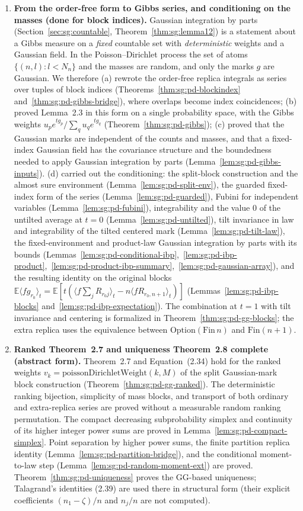 \begin{enumerate}
\item \textbf{From the order-free form to Gibbs series, and conditioning on the masses (done for block indices).} Gaussian integration by parts (Section~\ref{sec:sg:countable}, Theorem~\ref{thm:sg:lemma12}) is a statement about a Gibbs measure on a \emph{fixed} countable set with \emph{deterministic} weights and a Gaussian field. In the Poisson--Dirichlet process the set of atoms $\{(n,l):l<N_n\}$ and the masses are random, and only the marks $g$ are Gaussian. We therefore (a) rewrote the order-free replica integrals as series over tuples of block indices (Theorems~\ref{thm:sg:pd-blockindex} and~\ref{thm:sg:pd-gibbs-bridge}), where overlaps become index coincidences; (b) proved Lemma~2.3 in this form on a single probability space, with the Gibbs weights $u_pe^{tg_p}/\sum_qu_qe^{tg_q}$ (Theorem~\ref{thm:sg:pd-gibbs}); (c) proved that the Gaussian marks are independent of the counts and masses, and that a fixed-index Gaussian field has the covariance structure and the boundedness needed to apply Gaussian integration by parts (Lemma~\ref{lem:sg:pd-gibbs-inputs}). (d) carried out the conditioning: the split-block construction and the almost sure environment (Lemma~\ref{lem:sg:pd-split-env}), the guarded fixed-index form of the series (Lemma~\ref{lem:sg:pd-guarded}), Fubini for independent variables (Lemma~\ref{lem:sg:pd-fubini}), integrability and the value $0$ of the untilted average at $t=0$ (Lemma~\ref{lem:sg:pd-untilted}), tilt invariance in law and integrability of the tilted centered mark (Lemma~\ref{lem:sg:pd-tilt-law}), the fixed-environment and product-law Gaussian integration by parts with its bounds (Lemmas~\ref{lem:sg:pd-conditional-ibp},~\ref{lem:sg:pd-ibp-product},~\ref{lem:sg:pd-product-ibp-summary},~\ref{lem:sg:pd-gaussian-array}), and the resulting identity on the original blocks $\mathbb E\langle fg_{r_0}\rangle_t=\mathbb E[t(\langle f\sum_jR_{r_0j}\rangle_t-n\langle fR_{r_0,n+1}\rangle_t)]$ (Lemmas~\ref{lem:sg:pd-ibp-blocks} and~\ref{lem:sg:pd-ibp-expectation}). The combination at $t=1$ with tilt invariance and centering is formalized in Theorem~\ref{thm:sg:pd-gg-blocks}; the extra replica uses the equivalence between $\mathrm{Option}(\mathrm{Fin}\,n)$ and $\mathrm{Fin}(n+1)$.
\item \textbf{Ranked Theorem~2.7 and uniqueness Theorem~2.8 complete (abstract form).} Theorem~2.7 and Equation~(2.34) hold for the ranked weights $v_k=\mathrm{poissonDirichletWeight}(k,M)$ of the split Gaussian-mark block construction (Theorem~\ref{thm:sg:pd-gg-ranked}). The deterministic ranking bijection, simplicity of mass blocks, and transport of both ordinary and extra-replica series are proved without a measurable random ranking permutation. The compact decreasing subprobability simplex and continuity of its higher integer power sums are proved in Lemma~\ref{lem:sg:pd-compact-simplex}. Point separation by higher power sums, the finite partition replica identity (Lemma~\ref{lem:sg:pd-partition-bridge}), and the conditional moment-to-law step (Lemma~\ref{lem:sg:pd-random-moment-ext}) are proved. Theorem~\ref{thm:sg:pd-uniqueness} proves the GG-based uniqueness; Talagrand's identities (2.39) are used there in structural form (their explicit coefficients $(n_1-\zeta)/n$ and $n_j/n$ are not computed).

\end{enumerate}
